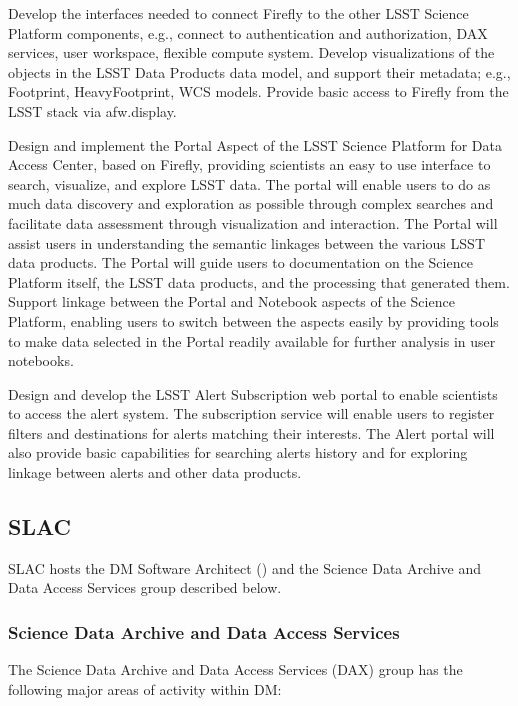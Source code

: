 Develop the interfaces needed to connect Firefly to the other LSST Science Platform components, e.g., connect to authentication and authorization, DAX services, user workspace, flexible compute system.  Develop visualizations of the objects in the LSST Data Products data model, and support their metadata; e.g., Footprint, HeavyFootprint, WCS models.  Provide basic access to Firefly from the LSST stack via afw.display.

Design and implement the Portal Aspect of the \gls{LSST} \gls{Science Platform} for \gls{Data Access Center}, based on \gls{Firefly}, providing scientists an easy to use interface to search, visualize, and explore \gls{LSST} data. The portal will enable users to do as much data discovery and exploration as possible through complex searches and facilitate data assessment through visualization and interaction.  The Portal will assist users in understanding the semantic linkages between the various \gls{LSST} data products. The Portal will guide users to documentation on the \gls{Science Platform} itself, the \gls{LSST} data products, and the processing that generated them.  Support linkage between the Portal and Notebook aspects of the \gls{Science Platform}, enabling users to switch between the aspects easily by providing tools to make data selected in the Portal readily available for further analysis in user notebooks.

Design and develop the \gls{LSST} \gls{Alert} Subscription web portal to enable scientists to access the alert system. The subscription service will enable users to register filters and destinations for alerts matching their interests. The \gls{Alert} portal will also provide basic capabilities for searching alerts history and for exploring linkage between alerts and other data products.




\subsection {SLAC\label{sect:slac}}
SLAC hosts the \gls{DM} Software Architect () and the Science Data \gls{Archive} and Data Access
Services group described below.

\subsubsection{Science Data \gls{Archive} and Data Access Services \label{sect:dax}}

The Science Data \gls{Archive} and Data Access Services (\gls{DAX}) group has the following major areas of activity
within \gls{DM}:

